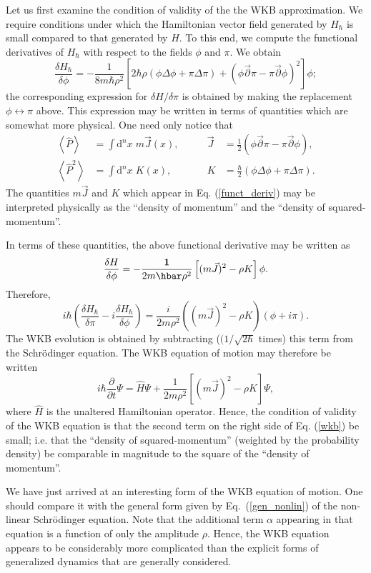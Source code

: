 \documentclass[12pt,aps,eqsecnum,tighten,nofootinbib]{revtex4-2}
\def\be{\begin{equation}}
\def\ee{\end{equation}}
\def\a{\alpha}
\def\d{{\mathrm d}}
\def\i{{i}}
\def\1{{\bf 1}}
\begin{document}
Let us first examine the condition of validity of the the WKB
approximation.  We require conditions under which the
Hamiltonian vector field generated by $H_\hbar$ is small compared to
that generated by $H$.  To this end, we compute the functional
derivatives of $H_\hbar$ with respect to the fields $\phi$ and $\pi$.
We obtain
%
\be \label{funct_deriv}
\frac{\delta H_\hbar}{\delta \phi} = 
-\frac{1}{8m\hbar\rho^2} \left[2\hbar\rho\left( \phi\Delta\phi 
+\pi\Delta\pi \right) + \left( \phi \vec{\partial}\pi -
\pi\vec{\partial}\phi \right)^2\right] \phi;
\ee
%
the corresponding expression for $\delta H / \delta\pi$ is obtained by
making the replacement $\phi \leftrightarrow \pi$ above.  This
expression may be written in terms of quantities which are somewhat
more physical.  One need only notice that
%
\be
\begin{array}{rlrl}
\left< \hat{P} \right> &= \int \d^n \! x \; m\vec{J}(x), \quad
\quad& \vec{J} &= \frac{1}{2} ( \phi\vec{\partial}\pi -
\pi\vec{\partial}\phi ), \\
%
\left< \hat{P}^2 \right> &= \int \d^n \! x \; K(x), \quad
\quad& K &= \frac{\hbar}{2} ( \phi\Delta\phi +
\pi\Delta\pi ).
\end{array}
\ee
%
The quantities $m\vec{J}$ and $K$ which appear in
Eq. (\ref{funct_deriv}) may be interpreted physically as the ``density
of momentum'' and the ``density of squared-momentum''.

In terms of these quantities, the above functional derivative may be
written as
%
\be
\frac{\delta H}{\delta \phi} = -\frac{\1}{2m\hbar\rho^2} \left[
(m\vec{J})^2 - \rho K \right] \phi.
\ee
%
Therefore,
%
\be
\i\hbar\left( \frac{\delta H_\hbar}{\delta \pi} - \i
\frac{\delta H_\hbar}{\delta \phi} \right) =
\frac{\i}{2m\rho^2}\left( (m\vec{J})^2 - \rho K \right)
(\phi + \i\pi). 
\ee
%
The WKB evolution is obtained by subtracting ($(1/\sqrt{2\hbar}$
times) this term from the Schr\"odinger equation.  The WKB equation of
motion may therefore be written
%
\be\label{wkb}
\i\hbar \frac{\partial}{\partial t}\Psi = \hat{H}\Psi + 
\frac{1}{2m\rho^2}\left[(m\vec{J})^2 - \rho K \right] \Psi,
\ee
%
where $\hat{H}$ is the unaltered Hamiltonian operator. Hence, the
condition of validity of the WKB equation is that the second term on
the right side of Eq. (\ref{wkb}) be small; i.e. that the ``density of
squared-momentum'' (weighted by the probability density) be comparable
in magnitude to the square of the ``density of momentum''.


We have just arrived at an interesting form of the WKB equation of
motion. One should compare it with the general form given by
Eq.~(\ref{gen_nonlin}) of the non-linear Schr\"odinger equation. Note
that the additional term $\a$ appearing in that equation is a function
of only the amplitude $\rho$. Hence, the WKB equation appears to be
considerably more complicated than the explicit forms of generalized
dynamics that are generally considered.
\end{document}
